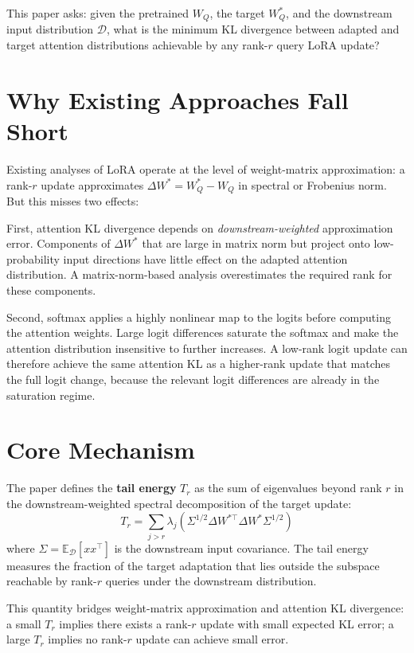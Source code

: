 \documentclass[10pt,twocolumn]{article}
\begin{document}
This paper asks: given the pretrained $W_Q$, the target $W_Q^*$, and the
downstream input distribution $\mathcal{D}$, what is the minimum KL
divergence between adapted and target attention distributions achievable
by any rank-$r$ query LoRA update?

\section{Why Existing Approaches Fall Short}

Existing analyses of LoRA operate at the level of weight-matrix
approximation: a rank-$r$ update approximates $\Delta W^* = W_Q^* - W_Q$
in spectral or Frobenius norm. But this misses two effects:

First, attention KL divergence depends on \emph{downstream-weighted}
approximation error. Components of $\Delta W^*$ that are large in matrix
norm but project onto low-probability input directions have little effect
on the adapted attention distribution. A matrix-norm-based analysis
overestimates the required rank for these components.

Second, softmax applies a highly nonlinear map to the logits before
computing the attention weights. Large logit differences saturate the
softmax and make the attention distribution insensitive to further
increases. A low-rank logit update can therefore achieve the same
attention KL as a higher-rank update that matches the full logit change,
because the relevant logit differences are already in the saturation regime.

\section{Core Mechanism}

The paper defines the \textbf{tail energy} $T_r$ as the sum of eigenvalues
beyond rank $r$ in the downstream-weighted spectral decomposition of the
target update:
\[
  T_r = \sum_{j > r} \lambda_j\!\left(\Sigma^{1/2} \Delta W^{*\top}
        \Delta W^* \Sigma^{1/2}\right)
\]
where $\Sigma = \mathbb{E}_{\mathcal{D}}[x x^\top]$ is the downstream
input covariance. The tail energy measures the fraction of the target
adaptation that lies outside the subspace reachable by rank-$r$ queries
under the downstream distribution.

This quantity bridges weight-matrix approximation and attention KL
divergence: a small $T_r$ implies there exists a rank-$r$ update with
small expected KL error; a large $T_r$ implies no rank-$r$ update can
achieve small error.
\end{document}
